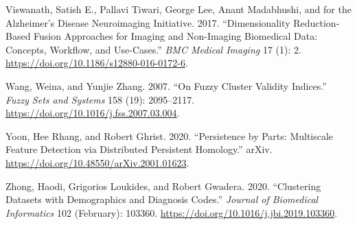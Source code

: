 \documentclass{article}
\newlength{\cslhangindent}
\newlength{\cslentryspacingunit} %
\newenvironment{CSLReferences}[2] %
 {%
  \setlength{\parindent}{0pt}
  \ifodd #1
  \let\oldpar\par
  \def\par{\hangindent=\cslhangindent\oldpar}
  \fi
  \setlength{\parskip}{#2\cslentryspacingunit}
 }%
 {}
\begin{document}
\begin{CSLReferences}{1}{0}
\leavevmode{}%
Viswanath, Satish E., Pallavi Tiwari, George Lee, Anant Madabhushi, and
for the Alzheimer's Disease Neuroimaging Initiative. 2017.
{``Dimensionality Reduction-Based Fusion Approaches for Imaging and
Non-Imaging Biomedical Data: Concepts, Workflow, and Use-Cases.''}
\emph{BMC Medical Imaging} 17 (1): 2.
\url{https://doi.org/10.1186/s12880-016-0172-6}.

\leavevmode{}%
Wang, Weina, and Yunjie Zhang. 2007. {``On Fuzzy Cluster Validity
Indices.''} \emph{Fuzzy Sets and Systems} 158 (19): 2095--2117.
\url{https://doi.org/10.1016/j.fss.2007.03.004}.

\leavevmode{}%
Yoon, Hee Rhang, and Robert Ghrist. 2020. {``Persistence by {Parts}:
{Multiscale Feature Detection} via {Distributed Persistent Homology}.''}
{arXiv}. \url{https://doi.org/10.48550/arXiv.2001.01623}.

\leavevmode{}%
Zhong, Haodi, Grigorios Loukides, and Robert Gwadera. 2020.
{``Clustering Datasets with Demographics and Diagnosis Codes.''}
\emph{Journal of Biomedical Informatics} 102 (February): 103360.
\url{https://doi.org/10.1016/j.jbi.2019.103360}.

\end{CSLReferences}



\end{document}
